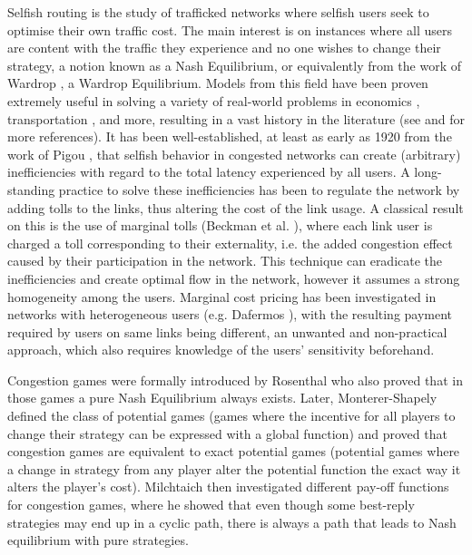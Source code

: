 \documentclass[10pt,a4paper]{book}
\theoremstyle{definition}
\theoremstyle{comment}
\begin{document}
Selfish routing is the study of trafficked networks where selfish users seek to optimise their own traffic cost.
The main interest is on instances where all users are content with the traffic they experience and no one wishes to change their strategy, a notion known as a Nash Equilibrium, or equivalently from the work of Wardrop \cite{wardrop_theoretical_1952}, a Wardrop Equilibrium.
Models from this field have been proven extremely useful in solving a variety of real-world problems in economics \cite{pigou1920economics}, transportation \cite{beckmann1956studies}, \cite{wardrop_theoretical_1952} and more, resulting in a vast history in the literature (see \cite{roughgarden2002sr} and \cite{roughgarden2005slpoa} for more references).
It has been well-established, at least as early as 1920 from the work of Pigou \cite{pigou1920economics}, that selfish behavior in congested networks can create (arbitrary) inefficiencies with regard to the total latency experienced by all users.
A long-standing practice to solve these inefficiencies has been to regulate the network by adding tolls to the links, thus altering the cost of the link usage.
A classical result on this is the use of marginal tolls (Beckman et al. \cite{beckmann1956studies}), where each link user is charged a toll corresponding to their externality, i.e. the added congestion effect caused by their participation in the network.
This technique can eradicate the inefficiencies and create optimal flow in the network, however it assumes a strong homogeneity among the users.
Marginal cost pricing has been investigated in networks with heterogeneous users (e.g. Dafermos \cite{dafermos1973toll}), with the resulting payment required by users on same links being different, an unwanted and non-practical approach, which also requires knowledge of the users' sensitivity beforehand.

Congestion games were formally introduced by Rosenthal \cite{Rosenthal1973ACO} who also proved that in those games a pure Nash Equilibrium always exists.
Later, Monterer-Shapely \cite{MONDERER1996124} defined the class of potential games (games where the incentive for all players to change their strategy can be expressed with a global function) and proved that congestion games are equivalent to exact potential games (potential games where a change in strategy from any player alter the potential function the exact way it alters the player's cost).
Milchtaich \cite{MILCHTAICH1996111} then investigated different pay-off functions for congestion games, where he showed that even though some best-reply strategies may end up in a cyclic path, there is always a path that leads to Nash equilibrium with pure strategies.
\end{document}
